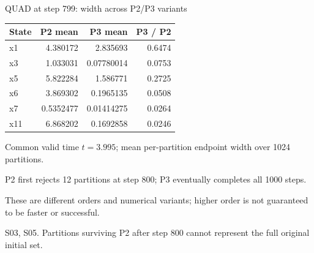 \documentclass[aspectratio=169,11pt]{beamer}
\newcommand{\src}[1]{\par\vfill{\fontsize{7}{9}\selectfont\color{gray}#1\par}}
\begin{document}
\begin{frame}[t]{QUAD at step 799: width across P2/P3 variants}
\relax
\relax
{\small\setlength{\tabcolsep}{3.2pt}\renewcommand{\arraystretch}{1.18}
\noindent\begin{tabular*}{\linewidth}{@{\extracolsep{\fill}}lrrr@{}}\toprule
\textbf{State} & \textbf{P2 mean} & \textbf{P3 mean} & \textbf{P3 / P2}\\ \midrule
x1 & 4.380172 & 2.835693 & 0.6474\\
x3 & 1.033031 & 0.07780014 & 0.0753\\
x5 & 5.822284 & 1.586771 & 0.2725\\
x6 & 3.869302 & 0.1965135 & 0.0508\\
x7 & 0.5352477 & 0.01414275 & 0.0264\\
x11 & 6.868202 & 0.1692858 & 0.0246\\
\bottomrule\end{tabular*}\par{}}\vspace{0.3cm}Common valid time \(t=3.995\); mean per-partition endpoint width over 1024 partitions.\par{}P2 first rejects 12 partitions at step 800; P3 eventually completes all 1000 steps.\par{}These are different orders and numerical variants; higher order is not guaranteed to be faster or successful.
\src{S03, S05. Partitions surviving P2 after step 800 cannot represent the full original initial set.}
\end{frame}
\end{document}
